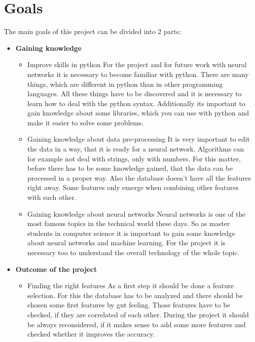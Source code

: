 \section{Goals}
The main goals of this project can be divided into 2 parts:
\begin{itemize}
	\item \textbf{Gaining knowledge}
		\begin{itemize}
			\item Improve skills in python\newline
			For the project and for future work with neural networks it is necessary to become familiar with python. There are many things, which are different in python than in other programming languages. All these things have to be discovered and it is necessary to learn how to deal with the python syntax. Additionally its important to gain knowledge about some libraries, which you can use with python and make it easier to solve some problems.
			\item Gaining knowledge about data pre-processing\newline 
			It is very important to edit the data in a way, that it is ready for a neural network. Algorithms can for example not deal with strings, only with numbers. For this matter, before there has to be some knowledge gained, that the data can be processed in a proper way. Also the database doesn't have all the features right away. Some features only emerge when combining other features with each other.
			\item Gaining knowledge about neural networks\newline
			Neural networks is one of the most famous topics in the technical world these days. So as master students in computer science it is important to gain some knowledge about neural networks and machine learning. For the project it is necessary too to understand the overall technology of the whole topic. 
		\end{itemize}
	\item \textbf{Outcome of the project}
		\begin{itemize}
			\item Finding the right features \newline
			As a first step it should be done a feature selection. For this the database has to be analyzed and there should be chosen some first features by gut feeling. Those features have to be checked, if they are correlated of each other. During the project it should be always reconsidered, if it makes sense to add some more features and checked whether it improves the accuracy. 

\end{itemize}
\end{itemize}
